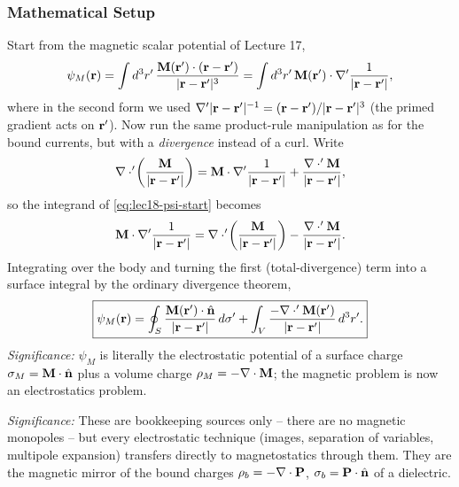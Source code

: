 \subsubsection*{Mathematical Setup}
Start from the magnetic scalar potential of Lecture 17,
\begin{equation}\label{eq:lec18-psi-start}
  \psi_M(\mathbf{r})=\int d^3r'\,
  \frac{\mathbf{M}(\mathbf{r}')\cdot(\mathbf{r}-\mathbf{r}')}{|\mathbf{r}-\mathbf{r}'|^3}
  =\int d^3r'\,\mathbf{M}(\mathbf{r}')\cdot\nabla'\frac{1}{|\mathbf{r}-\mathbf{r}'|},
\end{equation}
where in the second form we used
$\nabla'|\mathbf{r}-\mathbf{r}'|^{-1}=(\mathbf{r}-\mathbf{r}')/|\mathbf{r}-\mathbf{r}'|^3$ (the primed gradient acts on $\mathbf{r}'$).
Now run the same product-rule manipulation as for the bound currents, but with a
\emph{divergence} instead of a curl. Write
\begin{equation}\label{eq:lec18-product}
  \nabla \cdot'\!\left(\frac{\mathbf{M}}{|\mathbf{r}-\mathbf{r}'|}\right)
  =\mathbf{M}\cdot\nabla'\frac{1}{|\mathbf{r}-\mathbf{r}'|}
  +\frac{\nabla \cdot'\mathbf{M}}{|\mathbf{r}-\mathbf{r}'|},
\end{equation}
so the integrand of \eqref{eq:lec18-psi-start} becomes
\begin{equation}\label{eq:lec18-integrand}
  \mathbf{M}\cdot\nabla'\frac{1}{|\mathbf{r}-\mathbf{r}'|}
  =\nabla \cdot'\!\left(\frac{\mathbf{M}}{|\mathbf{r}-\mathbf{r}'|}\right)
  -\frac{\nabla \cdot'\mathbf{M}}{|\mathbf{r}-\mathbf{r}'|}.
\end{equation}
Integrating over the body and turning the first (total-divergence) term into a surface
integral by the ordinary divergence theorem,
\begin{equation}\label{eq:lec18-psi-split}
  \boxed{\psi_M(\mathbf{r})
  =\oint_S \frac{\mathbf{M}(\mathbf{r}')\cdot\hat{\mathbf{n}}}{|\mathbf{r}-\mathbf{r}'|}\,d\sigma'
  +\int_V \frac{-\nabla \cdot'\mathbf{M}(\mathbf{r}')}{|\mathbf{r}-\mathbf{r}'|}\,d^3r'.}
\end{equation}
\textit{Significance:} $\psi_M$ is literally the electrostatic potential of a surface
charge $\sigma_M=\mathbf{M}\cdot\hat{\mathbf{n}}$ plus a volume charge $\rho_M=-\nabla \cdot\mathbf{M}$; the
magnetic problem is now an electrostatics problem.

\textit{Significance:} These are bookkeeping sources only -- there are no magnetic
monopoles -- but every electrostatic technique (images, separation of variables,
multipole expansion) transfers directly to magnetostatics through them. They are the
magnetic mirror of the bound charges $\rho_b=-\nabla \cdot\mathbf{P}$, $\sigma_b=\mathbf{P}\cdot\hat{\mathbf{n}}$
of a dielectric.

